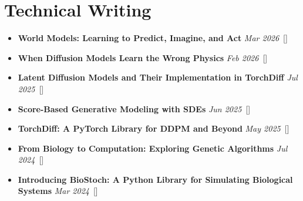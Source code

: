 \documentclass[a4paper,11pt]{article}
\begin{document}
\section{\textbf{Technical Writing}}
\vspace{0.5mm}
\small{
\begin{itemize}[leftmargin=*,labelsep=1mm,itemsep=0.5mm]
  \item \textbf{World Models: Learning to Predict, Imagine, and Act} \hfill \textit{Mar 2026}~[\href{https://loqmansamani.github.io/articles/model_based_rl/index.html}{\textcolor{darkblue}{\faGlobe}}]
  \item \textbf{When Diffusion Models Learn the Wrong Physics} \hfill \textit{Feb 2026}~[\href{https://medium.com/@samaniloqman91/when-diffusion-models-learn-the-wrong-physics-fa66a8fea0f2}{\textcolor{darkblue}{\faMedium}}]
  \item \textbf{Latent Diffusion Models and Their Implementation in TorchDiff} \hfill \textit{Jul 2025}~[\href{https://medium.com/@samaniloqman91/latent-diffusion-models-and-their-implementation-in-torchdiff-7dc04c33c4f7}{\textcolor{darkblue}{\faMedium}}]
  \item \textbf{Score-Based Generative Modeling with SDEs} \hfill \textit{Jun 2025}~[\href{https://medium.com/@samaniloqman91/score-based-generative-modeling-with-sdes-theory-and-implementation-in-torchdiff-db9a20a84978}{\textcolor{darkblue}{\faMedium}}]
  \item \textbf{TorchDiff: A PyTorch Library for DDPM and Beyond} \hfill \textit{May 2025}~[\href{https://medium.com/@samaniloqman91/torchdiff-a-pytorch-library-for-denoising-diffusion-probabilistic-models-and-beyond-d15156e9e3b5}{\textcolor{darkblue}{\faMedium}}]
  \item \textbf{From Biology to Computation: Exploring Genetic Algorithms} \hfill \textit{Jul 2024}~[\href{https://medium.com/@samaniloqman91/from-biology-to-computation-exploring-genetic-algorithms-5b090213351f}{\textcolor{darkblue}{\faMedium}}]
  \item \textbf{Introducing BioStoch: A Python Library for Simulating Biological Systems} \hfill \textit{Mar 2024}~[\href{https://medium.com/@samaniloqman91/introducing-biostoch-a-python-library-for-simulating-biological-systems-5d38df9b6991}{\textcolor{darkblue}{\faMedium}}]
\end{itemize}
}
\end{document}

